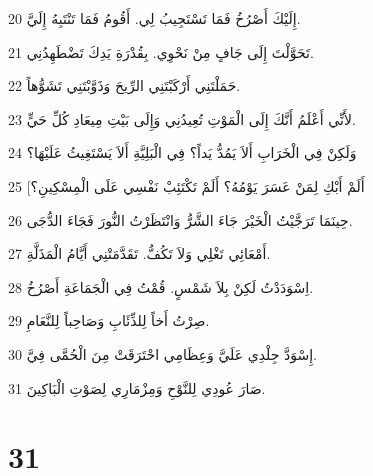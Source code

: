 \par 20 إِلَيْكَ أَصْرُخُ فَمَا تَسْتَجِيبُ لِي. أَقُومُ فَمَا تَنْتَبِهُ إِلَيَّ.
\par 21 تَحَوَّلْتَ إِلَى جَافٍ مِنْ نَحْوِي. بِقُدْرَةِ يَدِكَ تَضْطَهِدُنِي.
\par 22 حَمَلْتَنِي أَرْكَبْتَنِي الرِّيحَ وَذَوَّبْتَنِي تَشَوُّهاً.
\par 23 لأَنِّي أَعْلَمُ أَنَّكَ إِلَى الْمَوْتِ تُعِيدُنِي وَإِلَى بَيْتِ مِيعَادِ كُلِّ حَيٍّ.
\par 24 وَلَكِنْ فِي الْخَرَابِ أَلاَ يَمُدُّ يَداً؟ فِي الْبَلِيَّةِ أَلاَ يَسْتَغِيثُ عَلَيْهَا؟
\par 25 [أَلَمْ أَبْكِ لِمَنْ عَسَرَ يَوْمُهُ؟ أَلَمْ تَكْتَئِبْ نَفْسِي عَلَى الْمِسْكِينِ؟
\par 26 حِينَمَا تَرَجَّيْتُ الْخَيْرَ جَاءَ الشَّرُّ وَانْتَظَرْتُ النُّورَ فَجَاءَ الدُّجَى.
\par 27 أَمْعَائِي تَغْلِي وَلاَ تَكُفُّ. تَقَدَّمَتْنِي أَيَّامُ الْمَذَلَّةِ.
\par 28 اِسْوَدَدْتُ لَكِنْ بِلاَ شَمْسٍ. قُمْتُ فِي الْجَمَاعَةِ أَصْرُخُ.
\par 29 صِرْتُ أَخاً لِلذِّئَابِ وَصَاحِباً لِلنَّعَامِ.
\par 30 إِسْوَدَّ جِلْدِي عَلَيَّ وَعِظَامِي احْتَرَقَتْ مِنَ الْحُمَّى فِيَّ.
\par 31 صَارَ عُودِي لِلنَّوْحِ وَمِزْمَارِي لِصَوْتِ الْبَاكِينَ.

\chapter{31}


